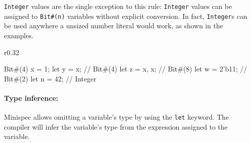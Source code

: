 \texttt{Integer} values are the single exception to this rule:
\texttt{Integer} values can be assigned to \texttt{Bit\#(n)} variables without explicit conversion.
In fact, \texttt{Integer}s can be used anywhere a unsized number literal would work,
as shown in the examples.


\begin{wrapfigure}{r}{0.32\columnwidth}
\vspace{-1.5em}
\begin{mscode}
Bit#(4) x = 1;   
let y = x;       // Bit#(4)
let z = {x, x};  // Bit#(8)
let w = 2'b11;   // Bit#(2)
let n = 42;      // Integer
\end{mscode}
\vspace{-3em}
\end{wrapfigure}


\paragraph{Type inference:} Minispec allows omitting a variable's type by using the \texttt{let} keyword.
The compiler will infer the variable's type from the expression assigned to the variable.



